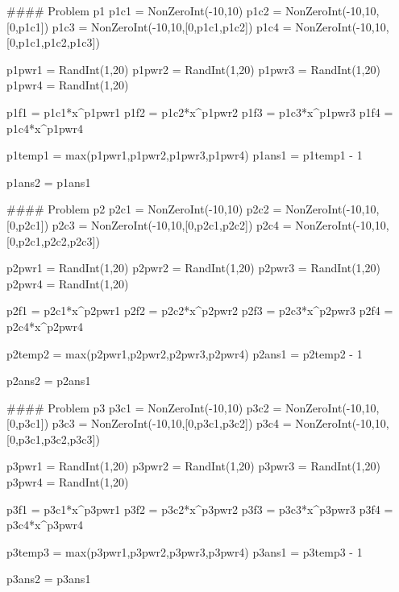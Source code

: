 \documentclass{ximera}
\begin{document}
\begin{sagesilent}

#### Problem p1
p1c1 = NonZeroInt(-10,10)
p1c2 = NonZeroInt(-10,10,[0,p1c1])
p1c3 = NonZeroInt(-10,10,[0,p1c1,p1c2])
p1c4 = NonZeroInt(-10,10,[0,p1c1,p1c2,p1c3])

p1pwr1 = RandInt(1,20)
p1pwr2 = RandInt(1,20)
p1pwr3 = RandInt(1,20)
p1pwr4 = RandInt(1,20)

p1f1 = p1c1*x^p1pwr1
p1f2 = p1c2*x^p1pwr2
p1f3 = p1c3*x^p1pwr3
p1f4 = p1c4*x^p1pwr4

p1temp1 = max(p1pwr1,p1pwr2,p1pwr3,p1pwr4)
p1ans1 = p1temp1 - 1

p1ans2 = p1ans1%


#### Problem p2
p2c1 = NonZeroInt(-10,10)
p2c2 = NonZeroInt(-10,10,[0,p2c1])
p2c3 = NonZeroInt(-10,10,[0,p2c1,p2c2])
p2c4 = NonZeroInt(-10,10,[0,p2c1,p2c2,p2c3])

p2pwr1 = RandInt(1,20)
p2pwr2 = RandInt(1,20)
p2pwr3 = RandInt(1,20)
p2pwr4 = RandInt(1,20)

p2f1 = p2c1*x^p2pwr1
p2f2 = p2c2*x^p2pwr2
p2f3 = p2c3*x^p2pwr3
p2f4 = p2c4*x^p2pwr4

p2temp2 = max(p2pwr1,p2pwr2,p2pwr3,p2pwr4)
p2ans1 = p2temp2 - 1

p2ans2 = p2ans1%


#### Problem p3
p3c1 = NonZeroInt(-10,10)
p3c2 = NonZeroInt(-10,10,[0,p3c1])
p3c3 = NonZeroInt(-10,10,[0,p3c1,p3c2])
p3c4 = NonZeroInt(-10,10,[0,p3c1,p3c2,p3c3])

p3pwr1 = RandInt(1,20)
p3pwr2 = RandInt(1,20)
p3pwr3 = RandInt(1,20)
p3pwr4 = RandInt(1,20)

p3f1 = p3c1*x^p3pwr1
p3f2 = p3c2*x^p3pwr2
p3f3 = p3c3*x^p3pwr3
p3f4 = p3c4*x^p3pwr4

p3temp3 = max(p3pwr1,p3pwr2,p3pwr3,p3pwr4)
p3ans1 = p3temp3 - 1

p3ans2 = p3ans1%





\end{sagesilent}
\end{document}
